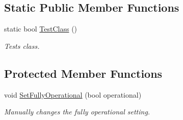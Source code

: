 \subsection*{Static Public Member Functions}
\begin{DoxyCompactItemize}
\item 
static bool \hyperlink{class_net_socket_simple_a69c2149f61ab6af018faf89e61ec6592}{TestClass} ()
\begin{DoxyCompactList}\small\item\em Tests class. \item\end{DoxyCompactList}\end{DoxyCompactItemize}
\subsection*{Protected Member Functions}
\begin{DoxyCompactItemize}
\item 
void \hyperlink{class_net_socket_simple_a2103700b007ee44bf91006dabc05aa90}{SetFullyOperational} (bool operational)
\begin{DoxyCompactList}\small\item\em Manually changes the fully operational setting. \item\end{DoxyCompactList}\end{DoxyCompactItemize}
